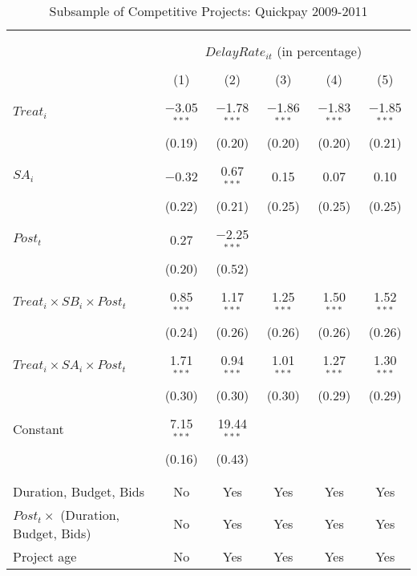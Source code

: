 \documentclass[
]{article}
\begin{document}
\begin{table}[H] \centering 
  \caption{Subsample of Competitive Projects: Quickpay 2009-2011} 
  \label{} 
\small 
\begin{tabular}{@{\extracolsep{-2pt}}lccccc} 
\\[-1.8ex]\hline 
\hline \\[-1.8ex] 
\\[-1.8ex] & \multicolumn{5}{c}{$DelayRate_{it}$ (in percentage)} \\ 
\\[-1.8ex] & (1) & (2) & (3) & (4) & (5)\\ 
\hline \\[-1.8ex] 
 $Treat_i$ & $-$3.05$^{***}$ & $-$1.78$^{***}$ & $-$1.86$^{***}$ & $-$1.83$^{***}$ & $-$1.85$^{***}$ \\ 
  & (0.19) & (0.20) & (0.20) & (0.20) & (0.21) \\ 
  & & & & & \\ 
 $SA_i$ & $-$0.32 & 0.67$^{***}$ & 0.15 & 0.07 & 0.10 \\ 
  & (0.22) & (0.21) & (0.25) & (0.25) & (0.25) \\ 
  & & & & & \\ 
 $Post_t$ & 0.27 & $-$2.25$^{***}$ &  &  &  \\ 
  & (0.20) & (0.52) &  &  &  \\ 
  & & & & & \\ 
 $Treat_i \times SB_i \times Post_t$ & 0.85$^{***}$ & 1.17$^{***}$ & 1.25$^{***}$ & 1.50$^{***}$ & 1.52$^{***}$ \\ 
  & (0.24) & (0.26) & (0.26) & (0.26) & (0.26) \\ 
  & & & & & \\ 
 $Treat_i \times SA_i \times Post_t$ & 1.71$^{***}$ & 0.94$^{***}$ & 1.01$^{***}$ & 1.27$^{***}$ & 1.30$^{***}$ \\ 
  & (0.30) & (0.30) & (0.30) & (0.29) & (0.29) \\ 
  & & & & & \\ 
 Constant & 7.15$^{***}$ & 19.44$^{***}$ &  &  &  \\ 
  & (0.16) & (0.43) &  &  &  \\ 
  & & & & & \\ 
\hline \\[-1.8ex] 
Duration, Budget, Bids & No & Yes & Yes & Yes & Yes \\ 
$Post_t \times $  (Duration, Budget, Bids) & No & Yes & Yes & Yes & Yes \\ 
Project age & No & Yes & Yes & Yes & Yes \\ 

\end{tabular}
\end{table}
\end{document}
